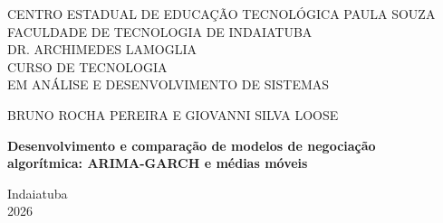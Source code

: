 \begin{capa}
\thispagestyle{empty}
\center

{\fontsize{14}{22}\selectfont
\MakeUppercase{Centro Estadual de Educação Tecnológica Paula Souza}\\
\MakeUppercase{Faculdade de Tecnologia de Indaiatuba}\\
\MakeUppercase{Dr. Archimedes Lamoglia}\\
\MakeUppercase{Curso de Tecnologia}\\
\MakeUppercase{em Análise e Desenvolvimento de Sistemas}\par}

\vspace{0.12\textheight}

{\fontsize{14}{18}\selectfont
\MakeUppercase{Bruno Rocha Pereira e Giovanni Silva Loose}\par}

\vfill

{\bfseries\fontsize{16}{20}\selectfont
Desenvolvimento e comparação de modelos de negociação\\
algorítmica: ARIMA-GARCH e médias móveis\par}

\vfill

{\fontsize{14}{18}\selectfont
Indaiatuba\\
2026\par}

\end{capa}
